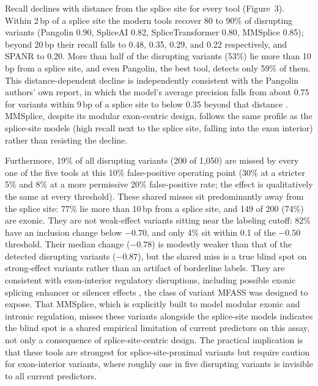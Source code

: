 \documentclass[11pt]{article}
\begin{document}
Recall declines with distance from the splice site for every tool (Figure~3).
Within 2\,bp of a splice site the modern tools recover 80 to 90\% of disrupting
variants (Pangolin 0.90, SpliceAI 0.82, SpliceTransformer 0.80, MMSplice 0.85);
beyond 20\,bp their recall falls to 0.48, 0.35, 0.29, and 0.22 respectively, and
SPANR to 0.20. More than half
of the disrupting variants (53\%) lie more than 10\,bp from a splice site, and even
Pangolin, the best tool, detects only 59\% of them. This distance-dependent decline
is independently consistent with the Pangolin authors' own report, in which the
model's average precision falls from about 0.75 for variants within 9\,bp of a splice
site to below 0.35 beyond that distance \cite{pangolin}. MMSplice, despite its
modular exon-centric design, follows the same profile as the splice-site models (high
recall next to the splice site, falling into the exon interior) rather than
resisting the decline.

Furthermore, 19\% of all disrupting variants (200 of 1{,}050) are missed by
every one of the five tools at this 10\% false-positive operating point (30\% at a
stricter 5\% and 8\% at a more permissive 20\% false-positive rate; the effect is
qualitatively the same at every threshold). These shared misses sit
predominantly away from the splice site: 77\% lie more than 10\,bp from a splice
site, and 149 of 200 (74\%) are exonic. They are not weak-effect variants sitting
near the labeling cutoff: 82\% have an inclusion change below $-0.70$, and only 4\%
sit within 0.1 of the $-0.50$ threshold. Their median change ($-0.78$) is modestly
weaker than that of the detected disrupting variants ($-0.87$), but the shared miss
is a true blind spot on strong-effect variants rather than an artifact of borderline
labels. They are consistent with exon-interior
regulatory disruptions, including possible exonic splicing enhancer or silencer
effects \cite{cartegni}, the class of variant
MFASS was designed to expose. That MMSplice, which is explicitly built to model modular
exonic and intronic regulation, misses these variants alongside the splice-site
models indicates the blind spot is a shared empirical limitation of current
predictors on this assay, not only a consequence of splice-site-centric design. The practical implication is that these tools are
strongest for splice-site-proximal variants but require caution for exon-interior
variants, where roughly one in five disrupting variants is invisible to all current
predictors.
\end{document}
